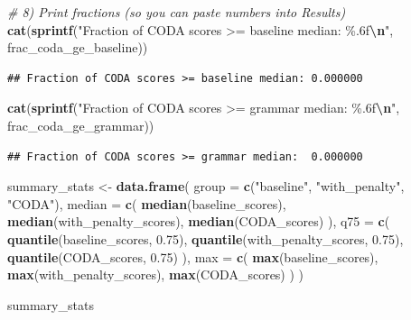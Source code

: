 \documentclass[
]{article}
\newenvironment{Shaded}{\begin{snugshade}}{\end{snugshade}}
\newcommand{\AttributeTok}[1]{\textcolor[rgb]{0.13,0.29,0.53}{#1}}
\newcommand{\CommentTok}[1]{\textcolor[rgb]{0.56,0.35,0.01}{\textit{#1}}}
\newcommand{\FloatTok}[1]{\textcolor[rgb]{0.00,0.00,0.81}{#1}}
\newcommand{\FunctionTok}[1]{\textcolor[rgb]{0.13,0.29,0.53}{\textbf{#1}}}
\newcommand{\NormalTok}[1]{#1}
\newcommand{\OtherTok}[1]{\textcolor[rgb]{0.56,0.35,0.01}{#1}}
\newcommand{\SpecialCharTok}[1]{\textcolor[rgb]{0.81,0.36,0.00}{\textbf{#1}}}
\newcommand{\StringTok}[1]{\textcolor[rgb]{0.31,0.60,0.02}{#1}}
\begin{document}
\begin{Shaded}
\begin{Highlighting}[]
\CommentTok{\# 8) Print fractions (so you can paste numbers into Results)}
\FunctionTok{cat}\NormalTok{(}\FunctionTok{sprintf}\NormalTok{(}\StringTok{"Fraction of CODA scores \textgreater{}= baseline median: \%.6f}\SpecialCharTok{\textbackslash{}n}\StringTok{"}\NormalTok{, frac\_coda\_ge\_baseline))}
\end{Highlighting}
\end{Shaded}

\begin{verbatim}
## Fraction of CODA scores >= baseline median: 0.000000
\end{verbatim}

\begin{Shaded}
\begin{Highlighting}[]
\FunctionTok{cat}\NormalTok{(}\FunctionTok{sprintf}\NormalTok{(}\StringTok{"Fraction of CODA scores \textgreater{}= grammar median:  \%.6f}\SpecialCharTok{\textbackslash{}n}\StringTok{"}\NormalTok{, frac\_coda\_ge\_grammar))}
\end{Highlighting}
\end{Shaded}

\begin{verbatim}
## Fraction of CODA scores >= grammar median:  0.000000
\end{verbatim}

\begin{Shaded}
\begin{Highlighting}[]
\NormalTok{summary\_stats }\OtherTok{\textless{}{-}} \FunctionTok{data.frame}\NormalTok{(}
  \AttributeTok{group =} \FunctionTok{c}\NormalTok{(}\StringTok{"baseline"}\NormalTok{, }\StringTok{"with\_penalty"}\NormalTok{, }\StringTok{"CODA"}\NormalTok{),}
  \AttributeTok{median =} \FunctionTok{c}\NormalTok{(}
    \FunctionTok{median}\NormalTok{(baseline\_scores),}
    \FunctionTok{median}\NormalTok{(with\_penalty\_scores),}
    \FunctionTok{median}\NormalTok{(CODA\_scores)}
\NormalTok{  ),}
  \AttributeTok{q75 =} \FunctionTok{c}\NormalTok{(}
    \FunctionTok{quantile}\NormalTok{(baseline\_scores, }\FloatTok{0.75}\NormalTok{),}
    \FunctionTok{quantile}\NormalTok{(with\_penalty\_scores, }\FloatTok{0.75}\NormalTok{),}
    \FunctionTok{quantile}\NormalTok{(CODA\_scores, }\FloatTok{0.75}\NormalTok{)}
\NormalTok{  ),}
  \AttributeTok{max =} \FunctionTok{c}\NormalTok{(}
    \FunctionTok{max}\NormalTok{(baseline\_scores),}
    \FunctionTok{max}\NormalTok{(with\_penalty\_scores),}
    \FunctionTok{max}\NormalTok{(CODA\_scores)}
\NormalTok{  )}
\NormalTok{)}

\NormalTok{summary\_stats}
\end{Highlighting}
\end{Shaded}
\end{document}
